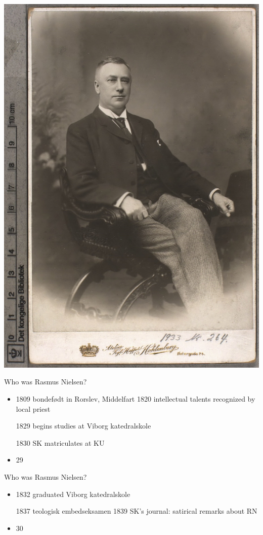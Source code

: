 \documentclass{beamer}
\begin{document}
\begin{frame}{28}
\includegraphics[width=0.9\linewidth]{slide28_img11.jpg}
\end{frame}
\begin{frame}{Who was Rasmus Nielsen?}
\begin{itemize}
  \item 1809 bondefødt in Rorslev, Middelfart
1820 intellectual talents recognized by local priest 

1829 begins studies at Viborg katedralskole 

	1830 SK matriculates at KU
  \item 29
\end{itemize}
\end{frame}
\begin{frame}{Who was Rasmus Nielsen?}
\begin{itemize}
  \item 1832 graduated Viborg katedralskole 

1837 teologisk embedseksamen
	1839 SK’s journal: satirical remarks about RN
  \item 30
\end{itemize}
\end{frame}
\end{document}
